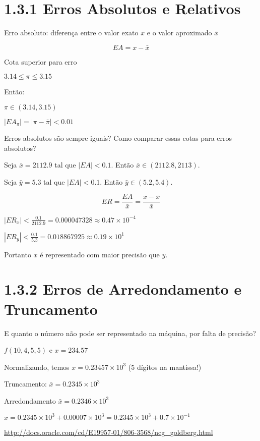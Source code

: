 \documentclass[a4paper]{article}
\begin{document}
\section*{1.3.1 Erros Absolutos e Relativos}

Erro absoluto: diferença entre o valor exato $x$ e o valor aproximado
$\bar{x}$

\begin{displaymath}
  EA = x - \bar{x}
\end{displaymath}
 
Cota superior para erro 

$ 3.14 \le \pi \le 3.15$

Então: 

$\pi \in (3.14,3.15)$

$|EA_\pi| = |\pi - \bar{\pi}| < 0.01$
 
Erros absolutos são sempre iguais? Como comparar essas cotas para erros absolutos?  
 
Seja $\bar{x} = 2112.9$ tal que $|EA|<0.1$. Então $\bar{x} \in
(2112.8,2113)$.

Seja $\bar{y} = 5.3$ tal que $|EA|<0.1$. Então $\bar{y} \in
(5.2,5.4)$.
 
\begin{displaymath}
  ER = \frac{EA}{\bar{x}} = \frac{x-\bar{x}}{\bar{x}}
\end{displaymath}

$|ER_x| < \frac{0.1}{2112.9} = 0.000047328 \approx 0.47\times 10^{-4}$

$|ER_y| < \frac{0.1}{5.3} = 0.018867925 \approx 0.19\times 10^1$
 
Portanto $x$ é representado com maior precisão que $y$.

\section*{1.3.2 Erros de Arredondamento e Truncamento}
E quanto o número não pode ser representado na máquina, por falta de precisão?
 
$f(10,4,5,5)$ e $x = 234.57$

Normalizando, temos $x=0.23457\times 10^3$ (5 dígitos na mantissa!)
 
Truncamento: $\bar{x}=0.2345\times 10^3$

Arredondamento $\bar{x}=0.2346\times 10^3$

$x = 0.2345\times 10^3 + 0.00007\times 10^3 = 0.2345\times 10^3 + 0.7\times 10^{-1}$



\url{http://docs.oracle.com/cd/E19957-01/806-3568/ncg_goldberg.html}
\end{document}
